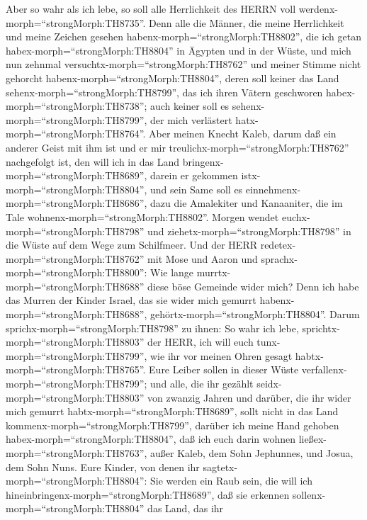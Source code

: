  Aber so wahr als ich lebe, so soll alle Herrlichkeit des
HERRN voll werdenx-morph=``strongMorph:TH8735''.  Denn alle
die Männer, die meine Herrlichkeit und meine Zeichen gesehen
habenx-morph=``strongMorph:TH8802'', die ich getan
habex-morph=``strongMorph:TH8804'' in Ägypten und in der Wüste, und mich
nun zehnmal versuchtx-morph=``strongMorph:TH8762'' und meiner Stimme
nicht gehorcht habenx-morph=``strongMorph:TH8804'',  deren
soll keiner das Land sehenx-morph=``strongMorph:TH8799'', das ich ihren
Vätern geschworen habex-morph=``strongMorph:TH8738''; auch keiner soll
es sehenx-morph=``strongMorph:TH8799'', der mich verlästert
hatx-morph=``strongMorph:TH8764''.  Aber meinen Knecht
Kaleb, darum daß ein anderer Geist mit ihm ist und er mir
treulichx-morph=``strongMorph:TH8762'' nachgefolgt ist, den will ich in
das Land bringenx-morph=``strongMorph:TH8689'', darein er gekommen
istx-morph=``strongMorph:TH8804'', und sein Same soll es
einnehmenx-morph=``strongMorph:TH8686'',  dazu die
Amalekiter und Kanaaniter, die im Tale
wohnenx-morph=``strongMorph:TH8802''. Morgen wendet
euchx-morph=``strongMorph:TH8798'' und
ziehetx-morph=``strongMorph:TH8798'' in die Wüste auf dem Wege zum
Schilfmeer.  Und der HERR
redetex-morph=``strongMorph:TH8762'' mit Mose und Aaron und
sprachx-morph=``strongMorph:TH8800'':  Wie lange
murrtx-morph=``strongMorph:TH8688'' diese böse Gemeinde wider mich? Denn
ich habe das Murren der Kinder Israel, das sie wider mich gemurrt
habenx-morph=``strongMorph:TH8688'',
gehörtx-morph=``strongMorph:TH8804''.  Darum
sprichx-morph=``strongMorph:TH8798'' zu ihnen: So wahr ich lebe,
sprichtx-morph=``strongMorph:TH8803'' der HERR, ich will euch
tunx-morph=``strongMorph:TH8799'', wie ihr vor meinen Ohren gesagt
habtx-morph=``strongMorph:TH8765''.  Eure Leiber sollen in
dieser Wüste verfallenx-morph=``strongMorph:TH8799''; und alle, die ihr
gezählt seidx-morph=``strongMorph:TH8803'' von zwanzig Jahren und
darüber, die ihr wider mich gemurrt habtx-morph=``strongMorph:TH8689'',
 sollt nicht in das Land
kommenx-morph=``strongMorph:TH8799'', darüber ich meine Hand gehoben
habex-morph=``strongMorph:TH8804'', daß ich euch darin wohnen
ließex-morph=``strongMorph:TH8763'', außer Kaleb, dem Sohn Jephunnes,
und Josua, dem Sohn Nuns.  Eure Kinder, von denen ihr
sagtetx-morph=``strongMorph:TH8804'': Sie werden ein Raub sein, die will
ich hineinbringenx-morph=``strongMorph:TH8689'', daß sie erkennen
sollenx-morph=``strongMorph:TH8804'' das Land, das ihr
